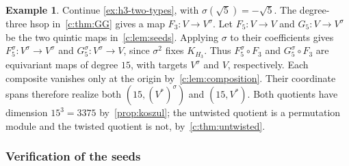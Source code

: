\documentclass[10pt,a4paper]{amsart}
\theoremstyle{definition}
\newtheorem{example}[theorem]{Example}
\begin{document}
\begin{example}\label{c:ex:h3-composition}
Continue \cref{ex:h3-two-types}, with $\sigma(\sqrt5)=-\sqrt5$.
The degree-three hsop in~\cref{c:thm:GG} gives a map
$F_3:V\to V^\sigma$. Let $F_5:V\to V$ and $G_5:V\to V^\sigma$
be the two quintic maps in~\cref{c:lem:seeds}.
Applying $\sigma$ to their coefficients gives
$F_5^\sigma:V^\sigma\to V^\sigma$ and
$G_5^\sigma:V^\sigma\to V$, since $\sigma^2$ fixes $K_{H_3}$.
Thus $F_5^\sigma\circ F_3$ and $G_5^\sigma\circ F_3$ are equivariant
maps of degree $15$, with targets $V^\sigma$ and $V$, respectively.
Each composite vanishes only at the origin by~\cref{c:lem:composition}.
Their coordinate spans therefore realize both $(15,(V^*)^\sigma)$
and $(15,V^*)$. Both quotients have dimension $15^3=3375$
by~\cref{prop:koszul}; the untwisted quotient is a permutation module
and the twisted quotient is not, by~\cref{c:thm:untwisted}.
\end{example}

\subsubsection{Verification of the seeds}
\end{document}
